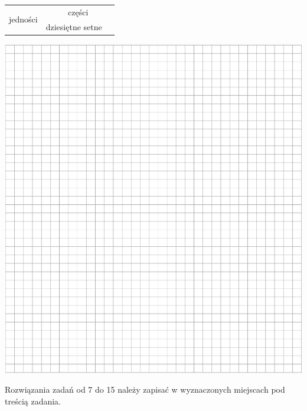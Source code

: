 \documentclass[10pt]{article}
\begin{document}
\begin{center}
\begin{tabular}{|l|l|l|}
\hline
\multirow{2}{*}{jedności} & \multicolumn{2}{|c|}{części} \\
\cline { 2 - 3 }
 & dziesiętne setne &  \\
\hline
\end{tabular}
\end{center}

\begin{center}
\includegraphics[max width=\textwidth]{2024_11_21_439e1d90cd1e7f928ae2g-04}
\end{center}

Rozwiązania zadań od 7 do 15 należy zapisać w wyznaczonych miejscach pod treścią zadania.
\end{document}
